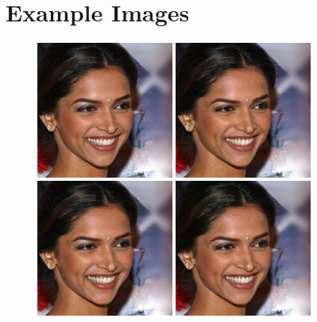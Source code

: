 \documentclass{article}
\begin{document}
    \section{Example Images}
    \begin{figure}[H]
        \centering
        \includegraphics[width=0.4\textwidth]{test_output/nearest celeb_a_hq.png}
        \includegraphics[width=0.4\textwidth]{test_output/bicubic celeb_a_hq.png}
        \includegraphics[width=0.4\textwidth]{test_output/model celeb_a_hq.png}
        \includegraphics[width=0.4\textwidth]{test_output/pretrained celeb_a_hq.png}

\end{figure}
\end{document}
